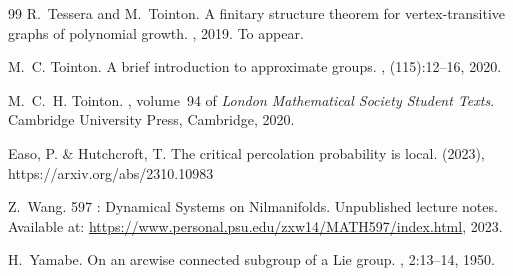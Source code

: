 \documentclass[11pt]{article}
\numberwithin{equation}{section}
\theoremstyle{plain}
\theoremstyle{definition}
\theoremstyle{remark}
\numberwithin{equation}{section}
\numberwithin{equation}{section}
\begin{document}
\begin{thebibliography}{99}
R.~Tessera and M.~Tointon.
\newblock A finitary structure theorem for vertex-transitive graphs of
  polynomial growth.
, 2019.
\newblock To appear.

M.~C. Tointon.
\newblock A brief introduction to approximate groups.
, (115):12--16, 2020.

M.~C.~H. Tointon.
, volume~94 of {\em London
  Mathematical Society Student Texts}.
\newblock Cambridge University Press, Cambridge, 2020.

Easo, P. \& Hutchcroft, T. The critical percolation probability is local.  (2023), https://arxiv.org/abs/2310.10983


Z.~Wang.
 597 : {D}ynamical {S}ystems on {N}ilmanifolds.
\newblock Unpublished lecture notes. Available at:
  \url{https://www.personal.psu.edu/zxw14/MATH597/index.html}, 2023.

H.~Yamabe.
\newblock On an arcwise connected subgroup of a {L}ie group.
, 2:13--14, 1950.

\end{thebibliography}
\end{document}
